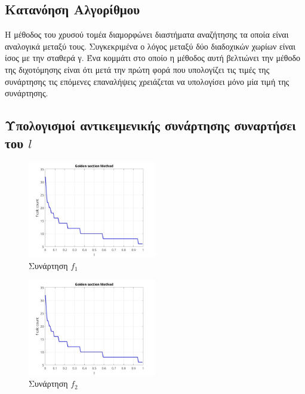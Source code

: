 \subsection{Κατανόηση Αλγορίθμου}
Η μέθοδος του χρυσού τομέα διαμορφώνει διαστήματα αναζήτησης τα οποία είναι αναλογικά μεταξύ τους.
Συγκεκριμένα ο λόγος μεταξύ δύο διαδοχικών χωρίων είναι ίσος με την σταθερά γ. Ένα κομμάτι στο 
οποίο η μέθοδος αυτή βελτιώνει την μέθοδο της διχοτόμησης είναι ότι μετά την πρώτη φορά που
υπολογίζει τις τιμές της συνάρτησης τις επόμενες επαναλήψεις χρειάζεται να υπολογίσει μόνο
μία τιμή της συνάρτησης. 

\subsection{Υπολογισμοί αντικειμενικής συνάρτησης συναρτήσει του $l$}

\begin{figure}[H] %
    \centering
    \includegraphics[width=0.5\textwidth]{media/goldenf1} %
    \caption{Συνάρτηση $f_1$}
\end{figure}

\begin{figure}[H] %
    \centering
    \includegraphics[width=0.5\textwidth]{media/goldenf2} %
    \caption{Συνάρτηση $f_2$}
\end{figure}

